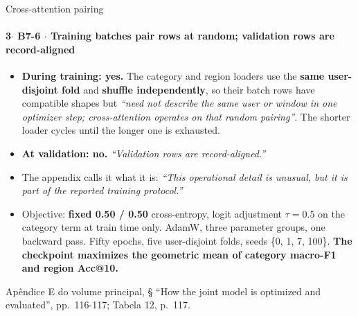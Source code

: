 \documentclass{beamer}
\begin{document}
\begin{frame}[noframenumbering]{Cross-attention pairing}
    \framesubtitle{\normalsize 3$\cdot$ \textbf{B7-6} $\cdot$ Training batches pair rows at random; validation rows are record-aligned}
    \hypertarget{b76}{}
    \small
    \begin{itemize}\setlength{\itemsep}{0pt}\setlength{\parskip}{0pt}
        \item \textcolor{alert}{\textbf{During training: yes.}} The category and region loaders use the \textbf{same user-disjoint fold} and \textbf{shuffle independently}, so their batch rows have compatible shapes but \textit{``need not describe the same user or window in one optimizer step; cross-attention operates on that random pairing''}. The shorter loader cycles until the longer one is exhausted.
        \item \textbf{At validation: no.} \textit{``Validation rows are record-aligned.''}
        \item The appendix calls it what it is: \textit{``This operational detail is unusual, but it is part of the reported training protocol.''}
        \item Objective: \textbf{fixed 0.50 / 0.50} cross-entropy, logit adjustment $\tau = 0.5$ on the category term at train time only. AdamW, three parameter groups, one backward pass. Fifty epochs, five user-disjoint folds, seeds \{0, 1, 7, 100\}. \textbf{The checkpoint maximizes the geometric mean of category macro-F1 and region Acc@10.}
    \end{itemize}
    \vfill
    {\scriptsize
    \begin{minipage}[b]{0.775\linewidth}\raggedright\textcolor{black!70}{Apêndice E do volume principal, § ``How the joint model is optimized and evaluated'', pp.~116-117; Tabela 12, p.~117.}\end{minipage}\hfill
    \begin{minipage}[b]{0.20\linewidth}\raggedleft \hyperlink{b0}{}\end{minipage}}
\end{frame}
\end{document}
